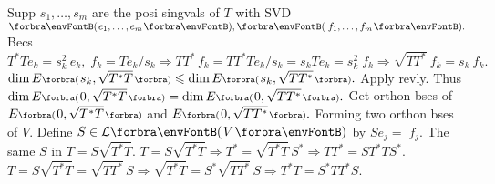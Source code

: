 
Supp $s_1,\dots,s_m$ are the posi singvals of $T$ with SVD $\Par{e_1,\dots,e_m},\Par{\,f_1,\dots,f_m}.$\vspace{1pt}\parSol{}
Becs $T^*Te_k=s_k^2\:\!e_k,\;f_k=Te_k\big/s_k\Rightarrow TT^*\,f_k=TT^*Te_k\big/s_k=s_kTe_k=s_k^2\;f_k\Rightarrow\sqrt{TT^*}\:f_k=s_k\:f_k.$\vspace{1pt}\parSol{}
$\dim E\BigPar{s_k,\sqrt{T^*T}}\leqslant\dim E\BigPar{s_k,\sqrt{TT^*}}.$ Apply revly. Thus $\dim E\BigPar{0,\sqrt{T^*T}}=\dim E\BigPar{0,\sqrt{TT^*}}.$\vspace{1pt}\parSol{}
Get orthon bses of $E\BigPar{0,\sqrt{T^*T}}$ and $E\BigPar{0,\sqrt{TT^*}}.$ Forming two orthon bses of $V.$\parSol{}
Define $S\in\Lm{V}$ by $Se_j=\;\!f_j.$ \quad\ANote The same $S$ in $T=S\sqrt{T^*T}.$\PfEnd\vspace{4pt}
\ACoro $T=S\sqrt{T^*T}\Rightarrow T^*=\sqrt{T^*T}\,S^*\Longrightarrow TT^*=ST^*TS^*.$\parCor
\Or $T=S\sqrt{T^*T}=\sqrt{TT^*}\,S\Rightarrow \sqrt{T^*T}=S^*\sqrt{TT^*}\,S\Longrightarrow T^*T=S^*TT^*S.$
\SepLine


